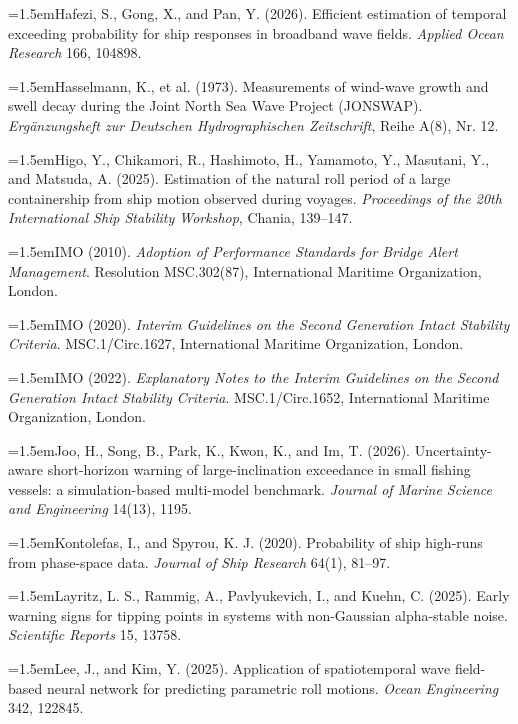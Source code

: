 \documentclass[11pt]{article}
\begin{document}
\hangindent=1.5em\noindent Hafezi, S., Gong, X., and Pan, Y. (2026). Efficient estimation of temporal exceeding probability for ship responses in broadband wave fields. \emph{Applied Ocean Research} 166, 104898.\par
\hangindent=1.5em\noindent Hasselmann, K., et al. (1973). Measurements of wind-wave growth and swell decay during the Joint North Sea Wave Project (JONSWAP). \emph{Erg\"anzungsheft zur Deutschen Hydrographischen Zeitschrift}, Reihe A(8\textdegree{}), Nr. 12.\par
\hangindent=1.5em\noindent Higo, Y., Chikamori, R., Hashimoto, H., Yamamoto, Y., Masutani, Y., and Matsuda, A. (2025). Estimation of the natural roll period of a large containership from ship motion observed during voyages. \emph{Proceedings of the 20th International Ship Stability Workshop}, Chania, 139--147.\par
\hangindent=1.5em\noindent IMO (2010). \emph{Adoption of Performance Standards for Bridge Alert Management}. Resolution MSC.302(87), International Maritime Organization, London.\par
\hangindent=1.5em\noindent IMO (2020). \emph{Interim Guidelines on the Second Generation Intact Stability Criteria}. MSC.1/Circ.1627, International Maritime Organization, London.\par
\hangindent=1.5em\noindent IMO (2022). \emph{Explanatory Notes to the Interim Guidelines on the Second Generation Intact Stability Criteria}. MSC.1/Circ.1652, International Maritime Organization, London.\par
\hangindent=1.5em\noindent Joo, H., Song, B., Park, K., Kwon, K., and Im, T. (2026). Uncertainty-aware short-horizon warning of large-inclination exceedance in small fishing vessels: a simulation-based multi-model benchmark. \emph{Journal of Marine Science and Engineering} 14(13), 1195.\par
\hangindent=1.5em\noindent Kontolefas, I., and Spyrou, K. J. (2020). Probability of ship high-runs from phase-space data. \emph{Journal of Ship Research} 64(1), 81--97.\par
\hangindent=1.5em\noindent Layritz, L. S., Rammig, A., Pavlyukevich, I., and Kuehn, C. (2025). Early warning signs for tipping points in systems with non-Gaussian alpha-stable noise. \emph{Scientific Reports} 15, 13758.\par
\hangindent=1.5em\noindent Lee, J., and Kim, Y. (2025). Application of spatiotemporal wave field-based neural network for predicting parametric roll motions. \emph{Ocean Engineering} 342, 122845.\par
\end{document}
